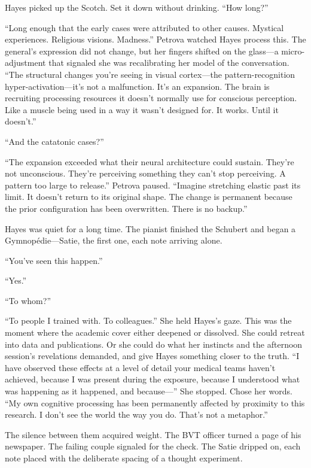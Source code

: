 Hayes picked up the Scotch. Set it down without drinking. ``How long?''

``Long enough that the early cases were attributed to other causes. Mystical experiences. Religious visions. Madness.'' Petrova watched Hayes process this. The general's expression did not change, but her fingers shifted on the glass---a micro-adjustment that signaled she was recalibrating her model of the conversation. ``The structural changes you're seeing in visual cortex---the pattern-recognition hyper-activation---it's not a malfunction. It's an expansion. The brain is recruiting processing resources it doesn't normally use for conscious perception. Like a muscle being used in a way it wasn't designed for. It works. Until it doesn't.''

``And the catatonic cases?''

``The expansion exceeded what their neural architecture could sustain. They're not unconscious. They're perceiving something they can't stop perceiving. A pattern too large to release.'' Petrova paused. ``Imagine stretching elastic past its limit. It doesn't return to its original shape. The change is permanent because the prior configuration has been overwritten. There is no backup.''

Hayes was quiet for a long time. The pianist finished the Schubert and began a Gymnop\'edie---Satie, the first one, each note arriving alone.

``You've seen this happen.''

``Yes.''

``To whom?''

``To people I trained with. To colleagues.'' She held Hayes's gaze. This was the moment where the academic cover either deepened or dissolved. She could retreat into data and publications. Or she could do what her instincts and the afternoon session's revelations demanded, and give Hayes something closer to the truth. ``I have observed these effects at a level of detail your medical teams haven't achieved, because I was present during the exposure, because I understood what was happening as it happened, and because---'' She stopped. Chose her words. ``My own cognitive processing has been permanently affected by proximity to this research. I don't see the world the way you do. That's not a metaphor.''

The silence between them acquired weight. The BVT officer turned a page of his newspaper. The failing couple signaled for the check. The Satie dripped on, each note placed with the deliberate spacing of a thought experiment.

